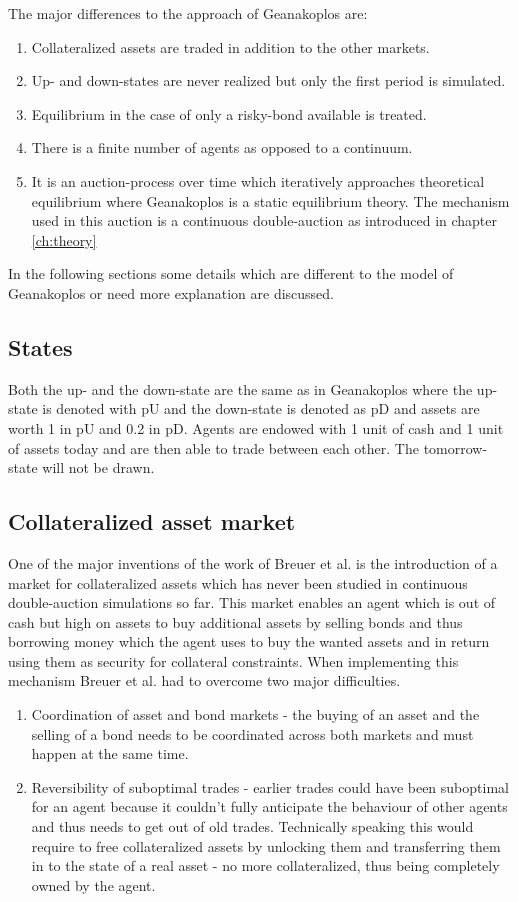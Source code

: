 \documentclass[../Bachelorarbeit.tex]{subfiles}
\begin{document}
The major differences to the approach of Geanakoplos are:
\begin{enumerate}
\item Collateralized assets are traded in addition to the other markets.
\item Up- and down-states are never realized but only the first period is simulated.
\item Equilibrium in the case of only a risky-bond available is treated.
\item There is a finite number of agents as opposed to a continuum.
\item It is an auction-process over time which iteratively approaches theoretical equilibrium where Geanakoplos is a static equilibrium theory. The mechanism used in this auction is a continuous double-auction as introduced in chapter \ref{ch:theory}
\end{enumerate}

In the following sections some details which are different to the model of Geanakoplos or need more explanation are discussed.

\subsection{States}
Both the up- and the down-state are the same as in Geanakoplos where the up-state is denoted with pU and the down-state is denoted as pD and assets are worth 1 in pU and 0.2 in pD. Agents are endowed with 1 unit of cash and 1 unit of assets today and are then able to trade between each other. The tomorrow-state will not be drawn.

\subsection{Collateralized asset market}
One of the major inventions of the work of Breuer et al. is the introduction of a market for collateralized assets which has never been studied in continuous double-auction simulations so far. This market enables an agent which is out of cash but high on assets to buy additional assets by selling bonds and thus borrowing money which the agent uses to buy the wanted assets and in return using them as security for collateral constraints. When implementing this mechanism Breuer et al. had to overcome two major difficulties.

\begin{enumerate}
\item Coordination of asset and bond markets - the buying of an asset and the selling of a bond needs to be coordinated across both markets and must happen at the same time.
\item Reversibility of suboptimal trades - earlier trades could have been suboptimal for an agent because it couldn't fully anticipate the behaviour of other agents and thus needs to get out of old trades. Technically speaking this would require to free collateralized assets by unlocking them and transferring them in to the state of a real asset - no more collateralized, thus being completely owned by the agent.
\end{enumerate}
\end{document}
